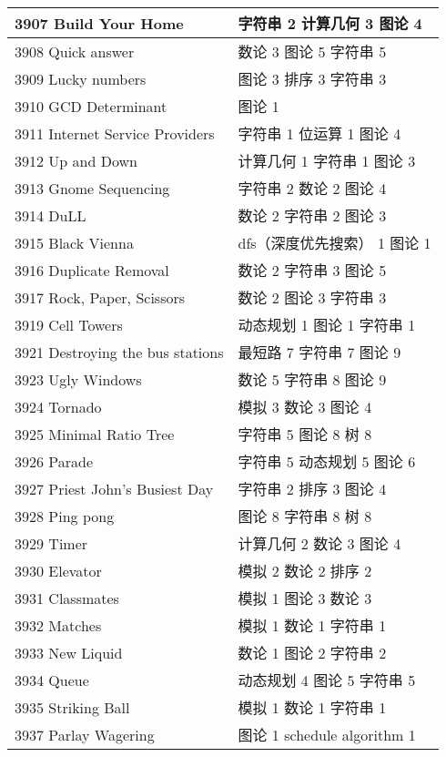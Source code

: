 \begin{longtable}{| p{} | p{} |}
 3907 Build Your Home  & 字符串 2 计算几何 3 图论 4 \\ \hline
 3908 Quick answer  & 数论 3 图论 5 字符串 5 \\ \hline
 3909 Lucky numbers  & 图论 3 排序 3 字符串 3 \\ \hline
 3910 GCD Determinant  & 图论 1 \\ \hline
 3911 Internet Service Providers  & 字符串 1 位运算 1 图论 4 \\ \hline
 3912 Up and Down  & 计算几何 1 字符串 1 图论 3 \\ \hline
 3913 Gnome Sequencing  & 字符串 2 数论 2 图论 4 \\ \hline
 3914 DuLL  & 数论 2 字符串 2 图论 3 \\ \hline
 3915 Black Vienna  & dfs（深度优先搜索） 1 图论 1 \\ \hline
 3916 Duplicate Removal  & 数论 2 字符串 3 图论 5 \\ \hline
 3917 Rock, Paper, Scissors  & 数论 2 图论 3 字符串 3 \\ \hline
 3919 Cell Towers  & 动态规划 1 图论 1 字符串 1 \\ \hline
 3921 Destroying the bus stations  & 最短路 7 字符串 7 图论 9 \\ \hline
 3923 Ugly Windows  & 数论 5 字符串 8 图论 9 \\ \hline
 3924 Tornado  & 模拟 3 数论 3 图论 4 \\ \hline
 3925 Minimal Ratio Tree  & 字符串 5 图论 8 树 8 \\ \hline
 3926 Parade  & 字符串 5 动态规划 5 图论 6 \\ \hline
 3927 Priest John's Busiest Day  & 字符串 2 排序 3 图论 4 \\ \hline
 3928 Ping pong  & 图论 8 字符串 8 树 8 \\ \hline
 3929 Timer  & 计算几何 2 数论 3 图论 4 \\ \hline
 3930 Elevator  & 模拟 2 数论 2 排序 2 \\ \hline
 3931 Classmates  & 模拟 1 图论 3 数论 3 \\ \hline
 3932 Matches  & 模拟 1 数论 1 字符串 1 \\ \hline
 3933 New Liquid  & 数论 1 图论 2 字符串 2 \\ \hline
 3934 Queue  & 动态规划 4 图论 5 字符串 5 \\ \hline
 3935 Striking Ball  & 模拟 1 数论 1 字符串 1 \\ \hline
 3937 Parlay Wagering  & 图论 1 schedule algorithm 1 \\ \hline

\end{longtable}
